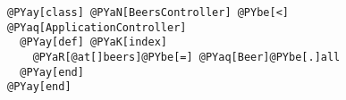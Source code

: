 \begin{Verbatim}[commandchars=@\[\]]
@PYay[class] @PYaN[BeersController] @PYbe[<] @PYaq[ApplicationController]
  @PYay[def] @PYaK[index]
    @PYaR[@at[]beers]@PYbe[=] @PYaq[Beer]@PYbe[.]all
  @PYay[end]
@PYay[end]
\end{Verbatim}
